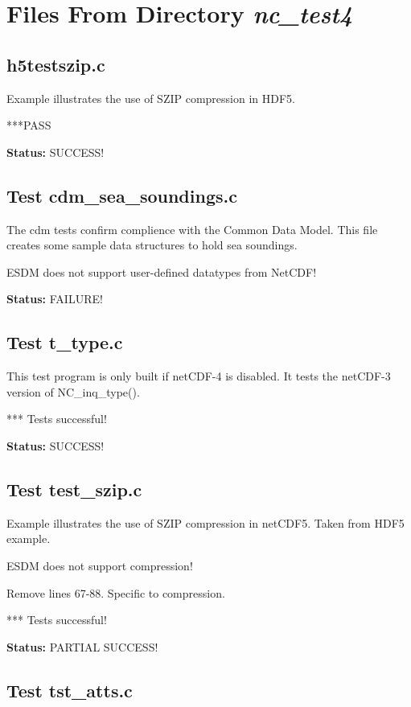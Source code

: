 \chapter{Files From Directory {\textit{nc\_test4}}}

\section{h5testszip.c}

Example illustrates the use of SZIP compression in HDF5.

***PASS

{\bf \large Status: } SUCCESS!

\section{Test cdm\_sea\_soundings.c}

The cdm tests confirm complience with the Common Data Model. This
file creates some sample data structures to hold sea soundings.

ESDM does not support user-defined datatypes from NetCDF!

{\bf \large Status: } FAILURE!

\section{Test t\_type.c}

This test program is only built if netCDF-4 is disabled. It tests
   the netCDF-3 version of NC\_inq\_type().

*** Tests successful!

{\bf \large Status: } SUCCESS!

\section{Test test\_szip.c}

Example illustrates the use of SZIP compression in netCDF5.
Taken from HDF5 example.

ESDM does not support compression!

Remove lines 67-88. Specific to compression.

*** Tests successful!

{\bf \large Status: } PARTIAL SUCCESS!

\section{Test tst\_atts.c}

